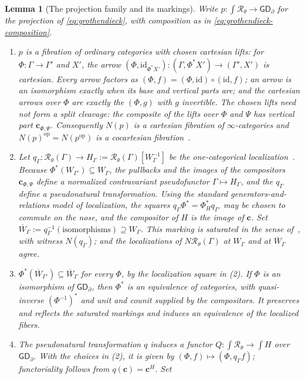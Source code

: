 \documentclass[11pt,letterpaper,twoside]{article}
\theoremstyle{plain}
\newtheorem{lemma}[theorem]{Lemma}
\theoremstyle{definition}
\theoremstyle{remark}
\let\cite\citep
\newcommand{\BGrm}{\mathsf{GD}_{\partial}}
\begin{document}
\begin{lemma}[The projection family and its markings]\label{lem:shadow-family}
Write \(p:\int\mathcal R_\theta\to\BGrm\) for the projection of \eqref{eq:grothendieck}, with composition as in \eqref{eq:grothendieck-composition}.
\begin{enumerate}
\item \(p\) is a fibration of ordinary categories with chosen cartesian lifts: for \(\Phi:\Gamma\to\Gamma'\) and \(X'\), the arrow \((\Phi,\mathrm{id}_{\Phi^*X'}):(\Gamma,\Phi^*X')\to(\Gamma',X')\) is cartesian.  Every arrow factors as \((\Phi,f)=(\Phi,\mathrm{id})\circ(\mathrm{id},f)\); an arrow is an isomorphism exactly when its base and vertical parts are; and the cartesian arrows over \(\Phi\) are exactly the \((\Phi,g)\) with \(g\) invertible.  The chosen lifts need not form a split cleavage: the composite of the lifts over \(\Phi\) and \(\Psi\) has vertical part \(\mathbf c_{\Phi,\Psi}\).  Consequently \(N(p)\) is a cartesian fibration of \(\infty\)-categories and \(N(p)^{\mathrm{op}}=N(p^{\mathrm{op}})\) is a cocartesian fibration~\cite[Tags~01RN, 01UB]{kerodon}.
\item Let \(q_\Gamma:\mathcal R_\theta(\Gamma)\to H_\Gamma:=\mathcal R_\theta(\Gamma)[W_\Gamma^{-1}]\) be the one-categorical localization~\cite{gabrielzisman1967}.  Because \(\Phi^*(W_{\Gamma'})\subseteq W_\Gamma\), the pullbacks and the images of the compositors \(\mathbf c_{\Phi,\Psi}\) define a normalized contravariant pseudofunctor \(\Gamma\mapsto H_\Gamma\), and the \(q_\Gamma\) define a pseudonatural transformation.  Using the standard generators-and-relations model of localization, the squares \(q_\Gamma\Phi^*=\Phi_H^*q_{\Gamma'}\) may be chosen to commute on the nose, and the compositor of \(H\) is the image of \(\mathbf c\).  Set \(\overline W_\Gamma:=q_\Gamma^{-1}(\text{isomorphisms})\supseteq W_\Gamma\).  This marking is saturated in the sense of~\cite[\S1.1.2]{hinich2016}, with witness \(N(q_\Gamma)\); and the localizations of \(N\mathcal R_\theta(\Gamma)\) at \(W_\Gamma\) and at \(\overline W_\Gamma\) agree.
\item \(\Phi^*(\overline W_{\Gamma'})\subseteq\overline W_\Gamma\) for every \(\Phi\), by the localization square in (2).  If \(\Phi\) is an isomorphism of \(\BGrm\), then \(\Phi^*\) is an equivalence of categories, with quasi-inverse \((\Phi^{-1})^*\) and unit and counit supplied by the compositors.  It preserves and reflects the saturated markings and induces an equivalence of the localized fibers.
\item The pseudonatural transformation \(q\) induces a functor \(Q:\int\mathcal R_\theta\to\int H\) over \(\BGrm\).  With the choices in (2), it is given by \((\Phi,f)\mapsto(\Phi,q_\Gamma f)\); functoriality follows from \(q(\mathbf c)=\mathbf c^H\).  Set

\end{enumerate}
\end{lemma}
\end{document}
